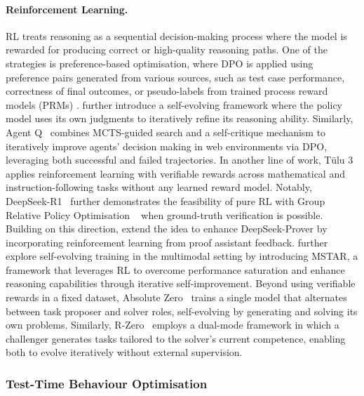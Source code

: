 \documentclass[]{selfevolagent}
\theoremstyle{plain}
\theoremstyle{definition}
\theoremstyle{remark}
\begin{document}
\paragraph{Reinforcement Learning.}
RL treats reasoning as a sequential decision-making process where the model is rewarded for producing correct or high-quality reasoning paths. 
One of the strategies is preference-based optimisation, where DPO \citep{rafailov2023direct} is applied using preference pairs generated from various sources, such as test case performance, correctness of final outcomes, or pseudo-labels from trained process reward models (PRMs) \citep{hui2024qwen2, min2024imitate, jiao-etal-2024-learning,liu2025learn}. \cite{yuan2024self} further introduce a self-evolving framework where the policy model uses its own judgments to iteratively refine its reasoning ability.
Similarly, Agent Q~\citep{putta2024agent} combines MCTS-guided search and a self-critique mechanism to iteratively improve agents' decision making in web environments via DPO, leveraging both successful and failed trajectories.
In another line of work, Tülu 3~\citep{lambert2024tulu} applies reinforcement learning with verifiable rewards across mathematical and instruction-following tasks without any learned reward model. Notably, DeepSeek-R1~\citep{guo2025deepseek} further demonstrates the feasibility of pure RL with Group Relative Policy Optimisation ~\citep{shao2024deepseekmath} when ground-truth verification is possible. 
Building on this direction, \cite{xin2025deepseekproverv} extend the idea to enhance DeepSeek-Prover by incorporating reinforcement learning from proof assistant feedback. \cite{liu2025diving} further explore self-evolving training in the multimodal setting by introducing MSTAR, a framework that leverages RL to overcome performance saturation and enhance reasoning capabilities through iterative self-improvement. 
Beyond using verifiable rewards in a fixed dataset, Absolute Zero~\citep{zhao2025absolute} trains a single model that alternates between task proposer and solver roles, self-evolving by generating and solving its own problems. 
Similarly, R-Zero~\citep{huang2025rzero} employs a dual-mode framework in which a challenger generates tasks tailored to the solver's current competence, enabling both to evolve iteratively without external supervision. 

\subsubsection{Test-Time Behaviour Optimisation} 
\end{document}
